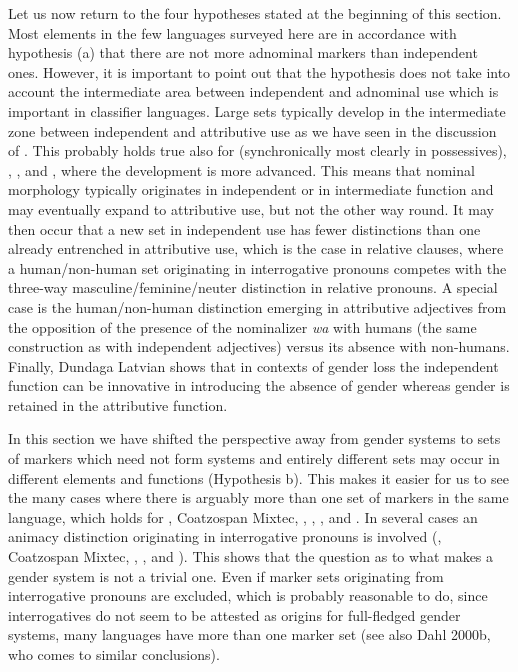 \documentclass[output=collectionpaper]{langsci/langscibook}
\begin{document}
Let us now return to the four hypotheses stated at the beginning of this section. Most elements in the few languages surveyed here are in accordance with hypothesis (a) that there are not more adnominal markers than independent ones. However, it is important to point out that the hypothesis does not take into account the intermediate area between independent and adnominal use which is important in classifier languages. Large sets typically develop in the intermediate zone between independent and attributive use as we have seen in the discussion of . This probably holds true also for  (synchronically most clearly in possessives), , , and , where the development is more advanced. This means that nominal morphology typically originates in independent or in intermediate function and may eventually expand to attributive use, but not the other way round. It may then occur that a new set in independent use has fewer distinctions than one already entrenched in attributive use, which is the case in  relative clauses, where a human/non-human set originating in interrogative pronouns competes with the three-way masculine/feminine/neuter distinction in relative pronouns. A special case is the  human/non-human distinction emerging in attributive adjectives from the opposition of the presence of the nominalizer \textit{wa} with humans (the same construction as with independent adjectives) versus its absence with non-humans. Finally, Dundaga Latvian shows that in contexts of gender loss the independent function can be innovative in introducing the absence of gender whereas gender is retained in the attributive function.

In this section we have shifted the perspective away from gender systems to sets of markers which need not form systems and entirely different sets may occur in different elements and functions (Hypothesis b). This makes it easier for us to see the many cases where there is arguably more than one set of markers in the same language, which holds for , Coatzospan Mixtec, , , , and . In several cases an animacy distinction originating in interrogative pronouns is involved (, Coatzospan Mixtec, , , and ). This shows that the question as to what makes a gender system is not a trivial one. Even if marker sets originating from interrogative pronouns are excluded, which is probably reasonable to do, since interrogatives do not seem to be attested as origins for full-fledged gender systems, many languages have more than one marker set (see also Dahl 2000b, who comes to similar conclusions).
\end{document}
